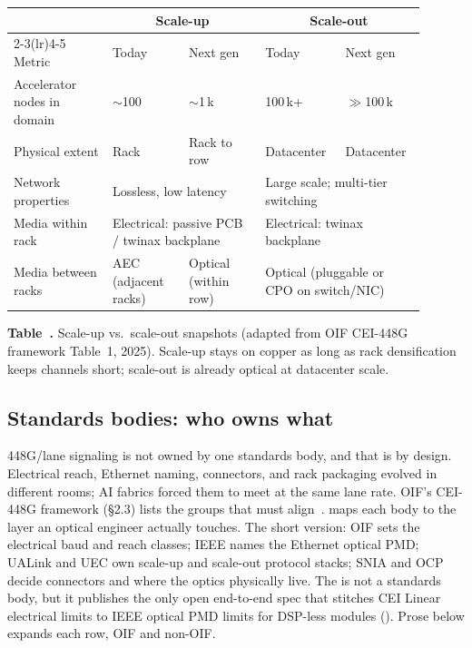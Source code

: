 \begin{table}[ht]
\label{tab:oif-scale}%
\centering
\setlength{\tabcolsep}{4pt}%
\footnotesize
\renewcommand{\arraystretch}{1.25}%
\begin{tabular}{@{}p{0.22\linewidth}p{0.17\linewidth}p{0.17\linewidth}p{0.17\linewidth}p{0.17\linewidth}@{}}
\toprule
 & \multicolumn{2}{c}{Scale-up} & \multicolumn{2}{c}{Scale-out} \\
\cmidrule(lr){2-3}\cmidrule(lr){4-5}
Metric & Today & Next gen & Today & Next gen \\
\midrule
Accelerator nodes in domain & $\sim$100 & $\sim$1\,k & 100\,k+ & $\gg$100\,k \\
\addlinespace[1.5em]
Physical extent & Rack & Rack to row & Datacenter & Datacenter \\
\addlinespace[1.5em]
Network properties & \multicolumn{2}{p{0.34\linewidth}}{Lossless, low latency} &
  \multicolumn{2}{p{0.34\linewidth}}{Large scale; multi-tier switching} \\
\addlinespace[1.5em]
Media within rack &
  \multicolumn{2}{p{0.34\linewidth}}{Electrical: passive PCB / twinax backplane} &
  \multicolumn{2}{p{0.34\linewidth}}{Electrical: twinax backplane} \\
\addlinespace[1.5em]
Media between racks &
  AEC (adjacent racks) & Optical (within row) &
  \multicolumn{2}{p{0.34\linewidth}}{Optical (pluggable or CPO on switch/NIC)} \\
\bottomrule
\end{tabular}
\par\medskip
{\raggedright\footnotesize\textbf{Table~\thetable.} Scale-up vs.\ scale-out
snapshots (adapted from OIF CEI-448G framework Table~1, 2025). Scale-up stays
on copper as long as rack densification keeps channels short; scale-out is already
optical at datacenter scale.\par}
\end{table}

\subsection{Standards bodies: who owns what}

448G/lane signaling is not owned by one standards body, and that is by design.
Electrical reach, Ethernet naming, connectors, and rack packaging evolved in
different rooms; AI fabrics forced them to meet at the same lane rate. OIF's
CEI-448G framework (\S2.3) lists the groups that must align~.
 maps each body to the layer an optical engineer actually
touches. The short version: OIF sets the electrical baud and reach classes; IEEE
names the Ethernet optical PMD; UALink and UEC own scale-up and scale-out
protocol stacks; SNIA and OCP decide connectors and where the optics physically
live. The  is not a standards body, but it publishes the only open
end-to-end spec that stitches CEI Linear electrical limits to IEEE optical PMD
limits for DSP-less modules (). Prose below expands each row,
OIF and non-OIF.

